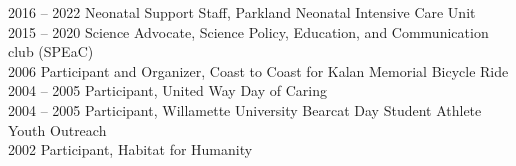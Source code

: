 2016 -- 2022 \hspace{26pt} Neonatal Support Staff, Parkland Neonatal Intensive Care Unit \\
2015 -- 2020 \hspace{26pt} Science Advocate, Science Policy, Education, and Communication club (SPEaC) \\
2006 \hspace{58pt} Participant and Organizer, Coast to Coast for Kalan Memorial Bicycle Ride \\
2004 -- 2005 \hspace{26pt} Participant, United Way Day of Caring \\
2004 -- 2005 \hspace{26pt} Participant, Willamette University Bearcat Day Student Athlete Youth Outreach \\
2002 \hspace{58pt} Participant, Habitat for Humanity \\
